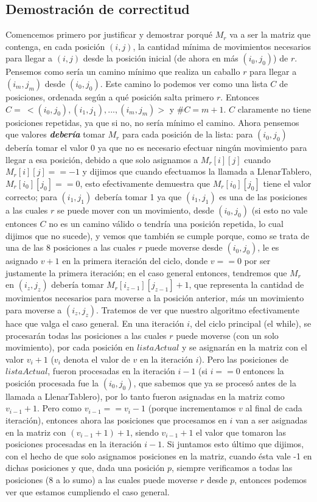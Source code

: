 \documentclass[a4paper]{article}
\begin{document}
\subsection{Demostración de correctitud}
Comencemos primero por justificar y demostrar porqué $M_r$ va a ser la matriz que contenga, en cada posición $(i, j)$, la cantidad mínima de movimientos necesarios para llegar a $(i, j)$ desde la posición inicial (de ahora en más $(i_0, j_0)$) de $r$.
Pensemos como sería un camino mínimo que realiza un caballo $r$ para llegar a $(i_m, j_m)$ desde $(i_0, j_0)$. Este camino lo podemos ver como una lista $C$ de posiciones, ordenada según a qué posición salta primero $r$. Entonces $C = \ <(i_0, j_0), (i_1, j_1), ... , (i_m, j_m)>$ y $\#C = m + 1$. $C$ claramente no tiene posiciones repetidas, ya que si no, no sería mínimo el camino. Ahora pensemos que valores \textit{\textbf{debería}} tomar $M_r$ para cada posición de la lista: para $(i_0, j_0)$ debería tomar el valor 0 ya que no es necesario efectuar ningún movimiento para llegar a esa posición, debido a que solo asignamos a $M_r[i][j]$ cuando $M_r[i][j] == -1$ y dijimos que cuando efectuamos la llamada a LlenarTablero, $M_r[i_0][j_0] == 0$, esto efectivamente demuestra que $M_r[i_0][j_0]$ tiene el valor correcto; para $(i_1, j_1)$ debería tomar 1 ya que $(i_1, j_1)$ es una de las posiciones a las cuales $r$ se puede mover con un movimiento, desde $(i_0, j_0)$ (si esto no vale entonces $C$ no es un camino válido o tendría una posición repetida, lo cual dijimos que no sucede), y vemos que también se cumple porque, como se trata de una de las 8 posiciones a las cuales $r$ puede moverse desde $(i_0, j_0)$, le es asignado $v + 1$ en la primera iteración del ciclo, donde $v == 0$ por ser justamente la primera iteración; en el caso general entonces, tendremos que $M_r$ en $(i_z, j_z)$ debería tomar $M_r[i_{z-1}][j_{z-1}] + 1$, que representa la cantidad de movimientos necesarios para moverse a la posición anterior, más un movimiento para moverse a $(i_z, j_z)$. Tratemos de ver que nuestro algoritmo efectivamente hace que valga el caso general. En una iteración $i$, del ciclo principal (el while), se procesarán todas las posiciones a las cuales $r$ puede moverse (con un solo movimiento), por cada posición en $listaActual$ y se asignarán en la matriz con el valor $v_i + 1$ ($v_i$ denota el valor de $v$ en la iteración $i$). Pero las posiciones de $listaActual$, fueron procesadas en la iteración $i - 1$ (si $i == 0$ entonces la posición procesada fue la $(i_0, j_0)$, que sabemos que ya se procesó antes de la llamada a LlenarTablero), por lo tanto fueron asignadas en la matriz como $v_{i - 1} + 1$. Pero como $v_{i - 1} == v_i - 1$ (porque incrementamos $v$ al final de cada iteración), entonces ahora las posiciones que procesamos en $i$ van a ser asignadas en la matriz con $(v_{i - 1} + 1) + 1$, siendo $v_{i - 1} + 1$ el valor que tomaron las posiciones procesadas en la iteración $i - 1$. Si juntamos esto último que dijimos, con el hecho de que solo asignamos posiciones en la matriz, cuando ésta vale -1 en dichas posiciones y que, dada una posición $p$, siempre verificamos a todas las posiciones (8 a lo sumo) a las cuales puede moverse $r$ desde $p$, entonces podemos ver que estamos cumpliendo el caso general.
\end{document}
